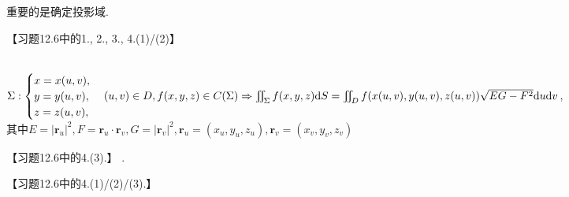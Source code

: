\documentclass[12pt,UTF8]{ctexart}
\begin{document}
\begin{enumerate}
\begin{enumerate}
重要的是确定投影域.

【习题12.6中的1., 2., 3., 4.(1)/(2)】

\\
$\Sigma: \begin{cases}x=x(u,v),\\ y=y(u,v),\\ z=z(u,v),\end{cases}(u,v)\in D,f(x,y,z)\in C(\Sigma)\\
\Rightarrow\iint_\Sigma f(x,y,z)\mathrm dS=\iint_Df(x(u,v),y(u,v),z(u,v))\sqrt{EG-F^2}\mathrm du\mathrm dv$, \\
其中$E=|\bm r_u|^2,F=\bm r_u\cdot\bm r_v,G=|\bm r_v|^2, \bm r_u=(x_u,y_u,z_u),\bm r_v=(x_v,y_v,z_v)$

【习题12.6中的4.(3).】
.

【习题12.6中的4.(1)/(2)/(3).】
\end{enumerate}
\end{enumerate}
\end{document}
